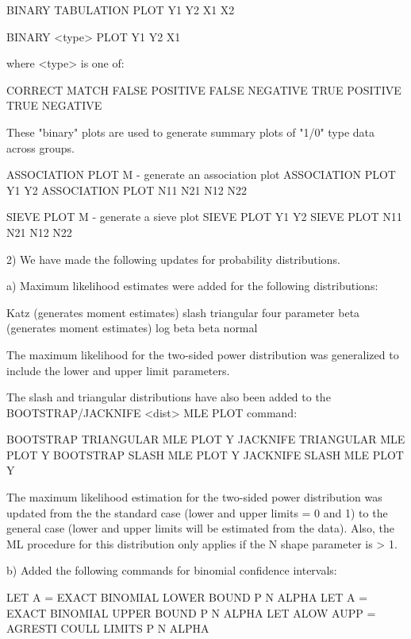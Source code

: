 {          BINARY TABULATION PLOT Y1 Y2 X1 X2

          BINARY <type> PLOT Y1 Y2 X1

          where <type> is one of:

              CORRECT MATCH
              FALSE POSITIVE
              FALSE NEGATIVE
              TRUE POSITIVE
              TRUE NEGATIVE

          These "binary" plots are used to generate summary
          plots of "1/0" type data across groups.

          ASSOCIATION PLOT M        - generate an association plot
          ASSOCIATION PLOT Y1 Y2
          ASSOCIATION PLOT N11 N21 N12 N22

          SIEVE PLOT M              - generate a sieve plot
          SIEVE PLOT Y1 Y2
          SIEVE PLOT N11 N21 N12 N22

 2) We have made the following updates for probability
    distributions.

    a) Maximum likelihood estimates were added for the
       following distributions:

          Katz                 (generates moment estimates)
          slash
          triangular
          four parameter beta  (generates moment estimates)
          log beta
          beta normal

       The maximum likelihood for the two-sided power distribution
       was generalized to include the lower and upper limit
       parameters.

       The slash and triangular distributions have also been
       added to the BOOTSTRAP/JACKNIFE <dist> MLE PLOT command:

           BOOTSTRAP TRIANGULAR MLE PLOT Y
           JACKNIFE TRIANGULAR MLE PLOT Y
           BOOTSTRAP SLASH MLE PLOT Y
           JACKNIFE SLASH MLE PLOT Y

       The maximum likelihood estimation for the 
       two-sided power distribution was updated from the
       the standard case (lower and upper limits = 0 and 1)
       to the general case (lower and upper limits will be
       estimated from the data).  Also, the ML procedure for
       this distribution only applies if the N shape parameter
       is > 1.

    b) Added the following commands for binomial confidence
       intervals:

          LET A = EXACT BINOMIAL LOWER BOUND P N ALPHA
          LET A = EXACT BINOMIAL UPPER BOUND P N ALPHA
          LET ALOW AUPP = AGRESTI COULL LIMITS P N ALPHA

}
